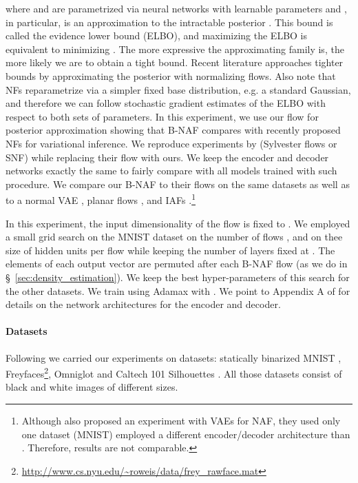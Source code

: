\documentclass[letterpaper]{article}
\begin{document}
where  and  are parametrized via neural networks with learnable parameters  and  \citep{kingma2013auto}, in particular,  is an approximation to the intractable posterior . 
This bound is called the evidence lower bound (ELBO), and maximizing the ELBO is equivalent to minimizing . The more expressive the approximating family is, the more likely we are to obtain a tight bound. Recent literature approaches tighter bounds by approximating the posterior with normalizing flows. Also note that NFs reparametrize  via a simpler fixed base distribution, e.g. a standard Gaussian, and therefore we can follow stochastic gradient estimates of the ELBO with respect to both sets of parameters. In this experiment, we use our flow for posterior approximation showing that B-NAF compares with recently proposed NFs for variational inference. We reproduce experiments by \citet{berg2018sylvester} (Sylvester flows or SNF) while replacing their flow with ours. We keep the encoder and decoder networks exactly the same to fairly compare with all models trained with such procedure. We compare our B-NAF to their flows on the same  datasets as well as to a normal VAE \citep{kingma2013auto}, planar flows \citep{rezende2015variational}, and IAFs \citep{kingma2016improved}.\footnote{
Although also \citet{huang2018neural} proposed an experiment with VAEs for NAF, they used only one dataset (MNIST) employed a different encoder/decoder architecture than \citet{berg2018sylvester}. Therefore, results are not comparable.}

In this experiment, the input dimensionality of the flow is fixed to . We employed a small grid search on the MNIST dataset on the number of flows , and on thee size of hidden units per flow  while keeping the number of layers fixed at . The elements of each output vector are permuted after each B-NAF flow (as we do in \S~\ref{sec:density_estimation}). We keep the best hyper-parameters of this search for the other datasets. We train using Adamax with . We point to Appendix A of \citet{berg2018sylvester} for details on the network architectures for the encoder and decoder.

\paragraph{Datasets} 
Following \citet{berg2018sylvester} we carried our experiments on  datasets: statically binarized MNIST \citep{larochelle2011neural}, Freyfaces\footnote{\url{http://www.cs.nyu.edu/~roweis/data/frey_rawface.mat}}, Omniglot \citep{lake2015human} and Caltech 101 Silhouettes \citep{marlin2010inductive}. All those datasets consist of black and white images of different sizes.
\end{document}
